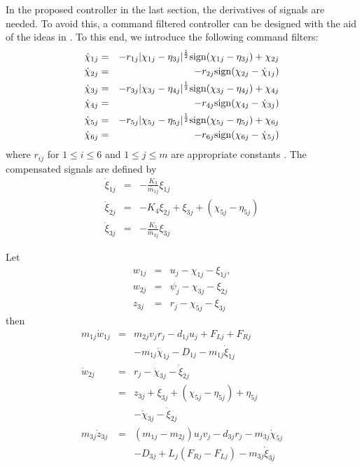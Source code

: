 \documentclass[letterpaper, 10 pt, conference]{ieeeconf}  %
\begin{document}
In the proposed controller in the last section, the derivatives of signals are needed. To avoid this, a command filtered controller can be designed with the aid of the ideas in \cite{YU2018173,farrell09,dongCST2012}. To this end, we introduce the following command filters:
\begin{eqnarray}
\dot{\chi}_{1j}&=&-r_{1j}|\chi_{1j}-\eta_{3j}|^{\frac{1}{2}}{\rm sign}(\chi_{1j}-\eta_{3j})+\chi_{2j}\\
\dot{\chi}_{2j}&=&-r_{2j}{\rm sign}(\chi_{2j}-\dot{\chi}_{1j})\\
\dot{\chi}_{3j}&=&-r_{3j}|\chi_{3j}-\eta_{4j}|^{\frac{1}{2}}{\rm sign}(\chi_{3j}-\eta_{4j})+\chi_{4j}\\
\dot{\chi}_{4j}&=&-r_{4j}{\rm sign}(\chi_{4j}-\dot{\chi}_{3j})\\
\dot{\chi}_{5j}&=&-r_{5j}|\chi_{5j}-\eta_{5j}|^{\frac{1}{2}}{\rm sign}(\chi_{5j}-\eta_{5j})+\chi_{6j}\\
\dot{\chi}_{6j}&=&-r_{6j}{\rm sign}(\chi_{6j}-\dot{\chi}_{5j})
\end{eqnarray}
where $r_{ij}$ for $1\leq i\leq 6$ and $1\leq j\leq m$ are appropriate constants \cite{LEVANT1998379}. The compensated signals are defined by
\begin{eqnarray}
\dot{\xi}_{1j}&=&-\frac{K_3}{\bar{m}_{1j}}\xi_{1j}\\
\dot{\xi}_{2j}&=&-K_4\xi_{2j}+\xi_{3j}+(\chi_{5j}-\eta_{5j})\\
\dot{\xi}_{3j}&=&-\frac{K_5}{\bar{m}_{3j}}\xi_{3j}
\end{eqnarray}

Let \begin{eqnarray}
w_{1j}&=&u_j-\chi_{1j}-\xi_{1j},\\
w_{2j}&=&\psi_j-\chi_{3j}-\xi_{2j}\\
z_{3j}&=&r_j-\chi_{5j}-\xi_{3j}
\end{eqnarray}
then
\begin{eqnarray}
m_{1j}\dot{w}_{1j}&=&m_{2j}v_jr_j-d_{1j}u_j+F_{Lj}+F_{Rj} \nonumber\\
&&-m_{1j}\dot{\chi}_{1j}-D_{1j}-m_{1j}\dot{\xi}_{1j}\label{ge35ac}\\
\dot{w}_{2j}&=&r_j-\dot{\chi}_{3j}-\dot{\xi}_{2j}\nonumber\\
&=&z_{3j}+\xi_{3j}+(\chi_{5j}-\eta_{5j})+\eta_{5j}\nonumber\\
&&-\dot{\chi}_{3j}-\dot{\xi}_{2j}\label{ge37ac}\\
m_{3j}\dot{z}_{3j}&=&(m_{1j}-m_{2j})u_jv_j-d_{3j}r_j-m_{3j}\dot{\chi}_{5j}\nonumber\\
&&-D_{3j}+L_j(F_{Rj}-F_{Lj})-m_{3j}\dot{\xi}_{3j} \label{ge37dc}
\end{eqnarray}
\end{document}
